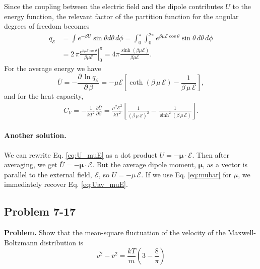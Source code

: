 \documentclass[twocolumn, 10pt]{article}
\numberwithin{equation}{section}
\newenvironment{problem}
{\par\medskip\sffamily \color{problue}
  \textbf{Problem. }\ignorespaces}
{\medskip}
\newenvironment{solution}[1][\empty]
{\par\medskip
  \textbf{\ifx\empty#1{Solution.}\relax\else{#1}\fi} \ignorespaces}
{\medskip}
\begin{document}
\begin{solution}
Since the coupling between the electric field
and the dipole contributes $U$
to the energy function,
the relevant factor of the partition function
for the angular degrees of freedom becomes
\begin{align*}
  q_{\mathscr E}
  &=
  \int e^{-\beta U} \sin\theta d\theta \, d\phi
  =
  \int_0^\pi
  \int_0^{2\pi}
  e^{\beta \mu \mathscr E \cos\theta}
  \sin\theta \, d\theta \, d\phi
  \\
  &=
  2 \, \pi \left. \frac{
    e^{\beta \mu \mathscr E \cos\theta }
  } { \beta \mu \mathscr E}
  \right|_{0}^\pi
  =
  4 \pi \frac{ \sinh(\beta\mu\mathscr E) }
  {\beta \mu \mathscr E}
  .
\end{align*}
For the average energy we have
\begin{equation}
  \overline U
  =
  - \frac{ \partial \, \ln q_{\mathscr E} }
         { \partial \, \beta }
  =
  -\mu \mathscr E
  \left[
    \coth(\beta \, \mu \, \mathscr E)
    -
    \frac{1}{\beta \, \mu \, \mathscr E}
  \right]
  ,
  \label{eq:Uav_muE}
\end{equation}
and for the heat capacity,
  \begin{align*}
  C_V
  =-\frac{ 1 } { k T^2 }
    \frac{ \partial \overline U }
    {\partial \beta }
  =
  \frac{ \mu^2 \mathscr E^2 } { kT^2 }
  \left[
    \frac{1}{(\beta \, \mu \, \mathscr E)^2}
    -
    \frac{1}{\sinh^2(\beta \, \mu \, \mathscr E)}
  \right].
  \end{align*}

\paragraph*{Another solution.}

We can rewrite Eq. \eqref{eq:U_muE} as
a dot product
$U = -\pmb\mu \cdot \mathscr E$.
%
Then after averaging, we get
$\overline U = -\overline{ \pmb\mu} \cdot \mathscr E$.
%
But the average dipole moment, $\pmb\mu$, as a vector
is parallel to the external field, $\mathscr E$,
so
$\overline U = -\overline{ \mu} \, \mathscr E$.
If we use Eq. \eqref{eq:mubar} for $\overline\mu$,
we immediately recover Eq. \eqref{eq:Uav_muE}.
\end{solution}


\subsection{Problem 7-17}

\begin{problem}
  Show that the mean-square fluctuation of
  the velocity of the Maxwell-Boltzmann distribution
  is
  $$
  \overline{ v^2 } - \overline{v}^2
  =
  \frac{ k T } { m }
  \left(3 - \frac{8}{\pi} \right)
  $$
\end{problem}
\end{document}
